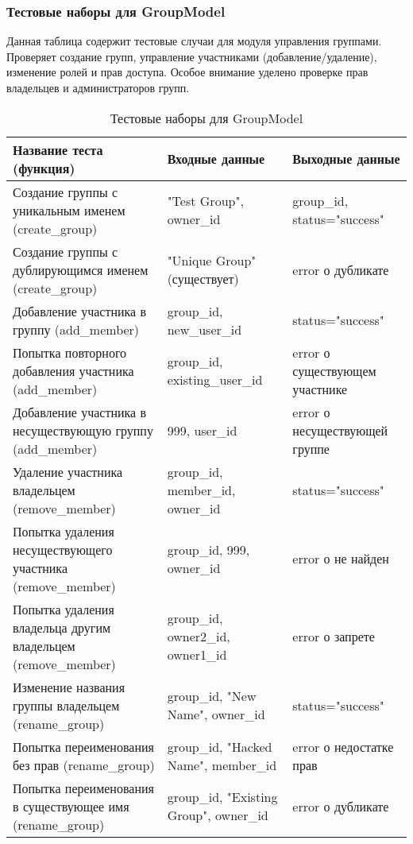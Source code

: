 \subsubsection{Тестовые наборы для GroupModel}

Данная таблица содержит тестовые случаи для модуля управления группами. Проверяет создание групп, управление участниками (добавление/удаление), изменение ролей и прав доступа. Особое внимание уделено проверке прав владельцев и администраторов групп.

\begin{xltabular}{\linewidth}{|X|X|X|}
	\caption{Тестовые наборы для GroupModel\label{groupmodel-tests}}\\ \hline
	\centrow Название теста (функция) & \centrow Входные данные & \centrow Выходные данные \\ \hline
	Создание группы с уникальным именем (create\_group) & "Test Group", owner\_id & group\_id, status="success" \\ \hline
	Создание группы с дублирующимся именем (create\_group) & "Unique Group" (существует) & error о дубликате \\ \hline
	Добавление участника в группу (add\_member) & group\_id, new\_user\_id & status="success" \\ \hline
	Попытка повторного добавления участника (add\_member) & group\_id, existing\_user\_id & error о существующем участнике \\ \hline
	Добавление участника в несуществующую группу (add\_member) & 999, user\_id & error о несуществующей группе \\ \hline
	Удаление участника владельцем (remove\_member) & group\_id, member\_id, owner\_id & status="success" \\ \hline
	Попытка удаления несуществующего участника (remove\_member) & group\_id, 999, owner\_id & error о не найден \\ \hline
	Попытка удаления владельца другим владельцем (remove\_member) & group\_id, owner2\_id, owner1\_id & error о запрете \\ \hline
	Изменение названия группы владельцем (rename\_group) & group\_id, "New Name", owner\_id & status="success" \\ \hline
	Попытка переименования без прав (rename\_group) & group\_id, "Hacked Name", member\_id & error о недостатке прав \\ \hline
	Попытка переименования в существующее имя (rename\_group) & group\_id, "Existing Group", owner\_id & error о дубликате \\ \hline

\end{xltabular}
